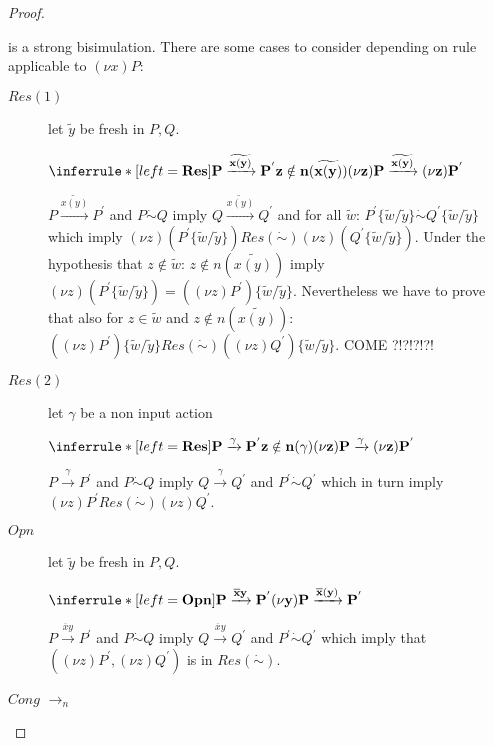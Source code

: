 \begin{proposition}
\begin{proof}
\begin{center}
	\end{center}
	is a strong bisimulation. There are some cases to consider depending on rule applicable to $(\nu x)P$:
	\begin{description}
	  \item[$Res(1)$]
	    let $\tilde{y}$ be fresh in $P,Q$.
	    \begin{center}
	      $\inferrule* [left=\bf{Res}]{
		  P \xrightarrow{\widetilde{x(y)}} P^{'}
		\\
		  z \notin n(\widetilde{x(y)})
	      }{
		(\nu z)P \xrightarrow{\widetilde{x(y)}} (\nu z)P^{'}
	      }$
	    \end{center}
	    $P \xrightarrow{\widetilde{x(y)}} P^{'}$ and $P\dot{\sim}Q$ imply $Q \xrightarrow{\widetilde{x(y)}} Q^{'}$ and for all $\tilde{w}$: $P^{'}\{\tilde{w}/\tilde{y}\} \dot{\sim} Q^{'}\{\tilde{w}/\tilde{y}\}$ which imply $(\nu z)(P^{'}\{\tilde{w}/\tilde{y}\}) Res(\dot{\sim}) (\nu z)(Q^{'}\{\tilde{w}/\tilde{y}\})$. Under the hypothesis that $z\notin \tilde{w}$: $z \notin n(\widetilde{x(y)})$ imply $(\nu z)(P^{'}\{\tilde{w}/\tilde{y}\})=((\nu z) P^{'})\{\tilde{w}/\tilde{y}\}$. Nevertheless we have to prove that also for $z\in \tilde{w}$ and $z \notin n(\widetilde{x(y)})$: $((\nu z)P^{'})\{\tilde{w}/\tilde{y}\} Res(\dot{\sim}) ((\nu z)Q^{'})\{\tilde{w}/\tilde{y}\}$.
	    COME ?!?!?!?!
	  \item[$Res(2)$]
	    let $\gamma$ be a non input action 
	    \begin{center}
	      $\inferrule* [left=\bf{Res}]{
		  P \xrightarrow{\gamma} P^{'}
		\\
		  z \notin n(\gamma)
	      }{
		(\nu z)P \xrightarrow{\gamma} (\nu z)P^{'}
	      }$
	    \end{center}
	    $P \xrightarrow{\gamma} P^{'}$ and $P\dot{\sim}Q$ imply $Q \xrightarrow{\gamma} Q^{'}$ and $P^{'} \dot{\sim} Q^{'}$ which in turn imply $(\nu z)P^{'} Res(\dot{\sim}) (\nu z)Q^{'}$.
	  \item[$Opn$]
	    let $\tilde{y}$ be fresh in $P,Q$.
	    \begin{center}
	      $\inferrule* [left=\bf{Opn}]{
		  P \xrightarrow{\overline{x}y} P^{'}
	      }{
		(\nu y)P \xrightarrow{\overline{x}(y)} P^{'}
	      }$
	    \end{center}
	    $P \xrightarrow{\overline{x}y} P^{'}$ and $P\dot{\sim}Q$ imply $Q \xrightarrow{\overline{x}y} Q^{'}$ and $P^{'} \dot{\sim} Q^{'}$ which imply that $((\nu z)P^{'}, (\nu z)Q^{'})$ is in $Res(\dot{\sim})$.
	  \item[$Cong$ $\rightarrow_{n}$]

\end{description}
\end{proof}
\end{proposition}
